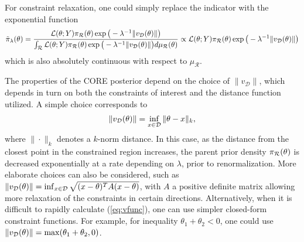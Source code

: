 \documentclass[10pt,fleqn]{article}
\DeclareMathOperator{\1}{\mathbbm{1}} \DeclareMathOperator{\bigO}{\mc O}
\begin{document}
For constraint relaxation, one could simply replace
the indicator  with the exponential function
\begin{equation}
\label{EQ:relaxedDensityPosMeasure}
\tilde{\pi}_\lambda(\theta) =
\frac{\mathcal{L}(\theta;
Y)\pi_\mathcal{R}(\theta)\exp\big(-
\lambda^{-1}{\|v_{\mathcal{D}}(\theta)\|}\big)}{\int_{\mathcal{R}}\mathcal{L}(\theta; Y)
\pi_\mathcal{R}(\theta)\exp\big(-{\lambda^{-1}}{\|v_{\mathcal{D}}(\theta)\|}\big)
d\mu_\mathcal{R}(\theta)} \propto
\mathcal{L}(\theta; Y)
\pi_\mathcal{R}(\theta)\exp\big(-{\lambda^{-1}}{\|v_{\mathcal{D}}(\theta)\|}\big)
\end{equation}
which is also absolutely continuous with respect to $\mu_\mathcal{R}.$

The properties of the CORE posterior depend on the choice of $\|v_{\mathcal D}\|$, which depends in turn on both the constraints of interest and the distance function utilized.  A simple choice corresponds to 
\begin{eqnarray}
\|v_{\mathcal{D}}(\theta)\| = \inf_{x\in\mathcal{D}} \|\theta-x\|_k, \label{eq:vfunc}
\end{eqnarray}
where $\|\cdot\|_k$ denotes a $k$-norm distance.  In this case, as the distance from the closest point in the constrained region increases, the parent prior density $\pi_{\mathcal{R}}(\theta)$ is decreased exponentially at a rate depending on $\lambda$, prior to renormalization.  More elaborate choices can also be considered, such as $\|v_{\mathcal{D}}(\theta)\| = \inf_{x\in\mathcal{D}}\sqrt{(x-\theta)^T A (x-\theta)}$, with $A$ a positive definite matrix allowing more relaxation of the constraints in certain directions.  Alternatively, when it is difficult to rapidly calculate (\ref{eq:vfunc}), one can use simpler closed-form constraint functions.   
For example, for inequality $\theta_1+\theta_2<0$, one could use $\|v_{\mathcal{D}}(\theta)\|=\max(\theta_1+\theta_2,0)$. 
\end{document}

